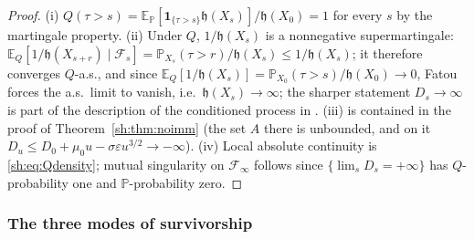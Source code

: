 \documentclass[11pt]{article}
\numberwithin{equation}{section}
\theoremstyle{plain}
\theoremstyle{definition}
\theoremstyle{remark}
\newcommand{\E}{\mathbb{E}}
\newcommand{\PP}{\mathbb{P}}
\newcommand{\one}{\mathbf{1}}
\newcommand{\Fc}{\mathcal{F}}
\newcommand{\hm}{\mathfrak{h}}
\begin{document}
\begin{proof}
(i) $Q(\tau>s)=\E_\PP[\one_{\{\tau>s\}}\hm(X_s)]/\hm(X_0)=1$ for every
$s$ by the martingale property. (ii) Under $Q$, $1/\hm(X_s)$ is a
nonnegative supermartingale:
$\E_Q[1/\hm(X_{s+r})\mid\Fc_s]
=\PP_{X_s}(\tau>r)/\hm(X_s)\le1/\hm(X_s)$; it therefore converges
$Q$-a.s., and since
$\E_Q[1/\hm(X_s)]=\PP_{X_0}(\tau>s)/\hm(X_0)\to0$, Fatou forces the a.s.\
limit to vanish, i.e.\ $\hm(X_s)\to\infty$; the sharper statement
$D_s\to\infty$ is part of the description of the conditioned process in
\cite{GJW99}. (iii) is contained in the proof of
Theorem~\ref{sh:thm:noimm} (the set $A$ there is unbounded, and on it
$D_u\le D_0+\mu_0u-\sigma\varepsilon u^{3/2}\to-\infty$). (iv) Local
absolute continuity is \eqref{sh:eq:Qdensity}; mutual singularity on
$\Fc_\infty$ follows since $\{\lim_sD_s=+\infty\}$ has $Q$-probability
one and $\PP$-probability zero.
\end{proof}

\subsubsection{The three modes of survivorship}\label{sh:subsub:modes}
\end{document}
